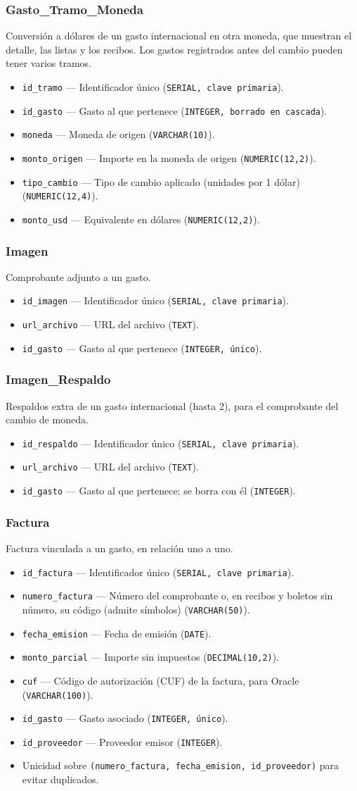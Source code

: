 \documentclass[11pt,letterpaper]{article}
\newcommand{\code}[1]{\nolinkurl{#1}}
\newcommand{\campo}[3]{\item \code{#1} --- #2 (\texttt{#3}).}
\begin{document}
\subsubsection{Gasto\_Tramo\_Moneda}
Conversión a dólares de un gasto internacional en otra moneda, que muestran el detalle, las listas y los recibos. Los gastos registrados antes del cambio pueden tener varios tramos.
\begin{itemize}
  \campo{id_tramo}{Identificador único}{SERIAL, clave primaria}
  \campo{id_gasto}{Gasto al que pertenece}{INTEGER, borrado en cascada}
  \campo{moneda}{Moneda de origen}{VARCHAR(10)}
  \campo{monto_origen}{Importe en la moneda de origen}{NUMERIC(12,2)}
  \campo{tipo_cambio}{Tipo de cambio aplicado (unidades por 1 dólar)}{NUMERIC(12,4)}
  \campo{monto_usd}{Equivalente en dólares}{NUMERIC(12,2)}
\end{itemize}

\subsubsection{Imagen}
Comprobante adjunto a un gasto.
\begin{itemize}
  \campo{id_imagen}{Identificador único}{SERIAL, clave primaria}
  \campo{url_archivo}{URL del archivo}{TEXT}
  \campo{id_gasto}{Gasto al que pertenece}{INTEGER, único}
\end{itemize}

\subsubsection{Imagen\_Respaldo}
Respaldos extra de un gasto internacional (hasta 2), para el comprobante del cambio de moneda.
\begin{itemize}
  \campo{id_respaldo}{Identificador único}{SERIAL, clave primaria}
  \campo{url_archivo}{URL del archivo}{TEXT}
  \campo{id_gasto}{Gasto al que pertenece; se borra con él}{INTEGER}
\end{itemize}

\subsubsection{Factura}
Factura vinculada a un gasto, en relación uno a uno.
\begin{itemize}
  \campo{id_factura}{Identificador único}{SERIAL, clave primaria}
  \campo{numero_factura}{Número del comprobante o, en recibos y boletos sin número, su código (admite símbolos)}{VARCHAR(50)}
  \campo{fecha_emision}{Fecha de emisión}{DATE}
  \campo{monto_parcial}{Importe sin impuestos}{DECIMAL(10,2)}
  \campo{cuf}{Código de autorización (CUF) de la factura, para Oracle}{VARCHAR(100)}
  \campo{id_gasto}{Gasto asociado}{INTEGER, único}
  \campo{id_proveedor}{Proveedor emisor}{INTEGER}
  \item Unicidad sobre \code{(numero_factura, fecha_emision, id_proveedor)} para evitar duplicados.
\end{itemize}
\end{document}
